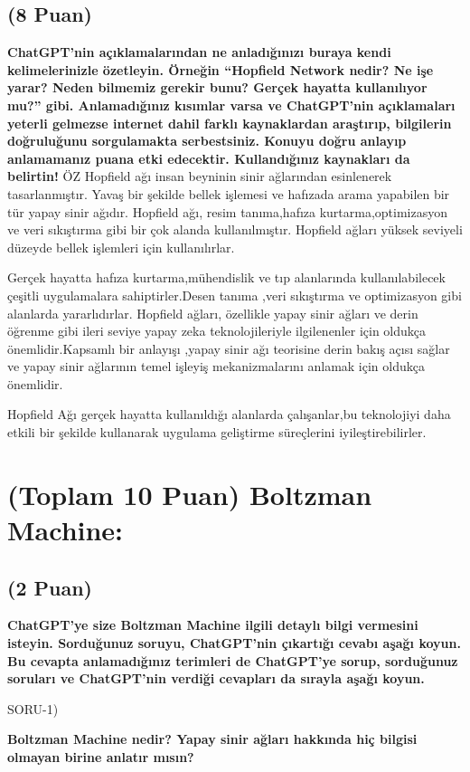 \documentclass[11pt]{article}
\begin{document}
\subsection{(8 Puan)} \textbf{ChatGPT’nin açıklamalarından ne anladığınızı buraya kendi kelimelerinizle özetleyin. Örneğin ``Hopfield Network nedir? Ne işe yarar? Neden bilmemiz gerekir bunu? Gerçek hayatta kullanılıyor mu?'' gibi. Anlamadığınız kısımlar varsa ve ChatGPT’nin açıklamaları yeterli gelmezse internet dahil farklı kaynaklardan araştırıp, bilgilerin doğruluğunu sorgulamakta serbestsiniz. Konuyu doğru anlayıp anlamamanız puana etki edecektir. Kullandığınız kaynakları da belirtin!}
ÖZ
Hopfield ağı insan beyninin sinir ağlarından esinlenerek tasarlanmıştır.  Yavaş bir şekilde bellek işlemesi ve hafızada arama yapabilen bir tür yapay sinir ağıdır. Hopfield ağı,  resim tanıma,hafıza kurtarma,optimizasyon ve veri sıkıştırma gibi bir çok alanda  kullanılmıştır.
Hopfield ağları yüksek seviyeli düzeyde bellek işlemleri için kullanılırlar. 

Gerçek hayatta hafıza kurtarma,mühendislik ve tıp alanlarında kullanılabilecek çeşitli uygulamalara sahiptirler.Desen tanıma ,veri sıkıştırma ve optimizasyon gibi alanlarda yararlıdırlar. 
Hopfield ağları, özellikle yapay sinir ağları ve derin öğrenme gibi ileri seviye yapay zeka teknolojileriyle ilgilenenler için oldukça önemlidir.Kapsamlı bir  anlayışı ,yapay sinir ağı teorisine derin bakış açısı sağlar ve yapay sinir ağlarının temel işleyiş mekanizmalarını anlamak için oldukça önemlidir. 

Hopfield Ağı gerçek hayatta kullanıldığı alanlarda çalışanlar,bu teknolojiyi daha etkili bir şekilde kullanarak uygulama geliştirme süreçlerini iyileştirebilirler.


\section{(Toplam 10 Puan) Boltzman Machine:}

\subsection{(2 Puan)} \textbf{ChatGPT’ye size Boltzman Machine ilgili detaylı bilgi vermesini isteyin. Sorduğunuz soruyu, ChatGPT'nin çıkartığı cevabı aşağı koyun. Bu cevapta anlamadığınız terimleri de ChatGPT’ye sorup, sorduğunuz soruları ve ChatGPT’nin verdiği cevapları da sırayla aşağı koyun.}

SORU-1)

\textbf{Boltzman Machine nedir? Yapay sinir ağları hakkında hiç bilgisi olmayan birine anlatır mısın?}
\end{document}
